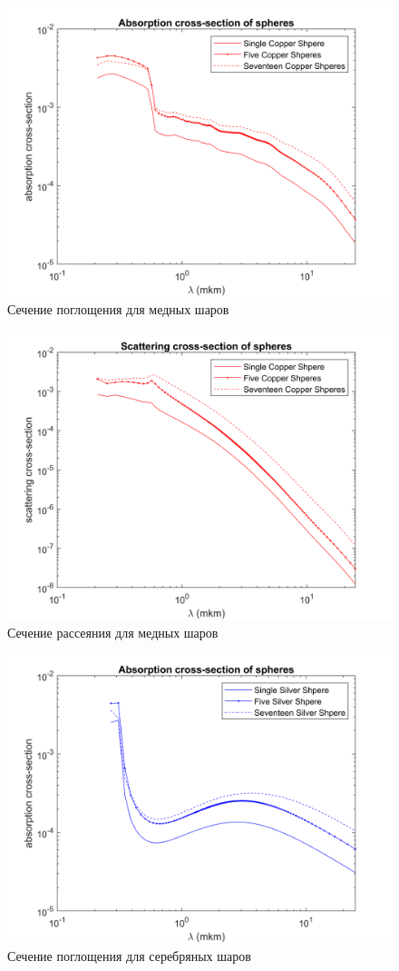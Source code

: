 \begin{figure}[h!]
	\centering
	\includegraphics[width=0.8\linewidth]{absorpForCopper}
	\caption{Сечение поглощения для медных шаров}
	\label{fig:absorpForCopper}
\end{figure}
\begin{figure}[h!]
	\centering
	\includegraphics[width=0.8\linewidth]{scatForCopper}
	\caption{Сечение рассеяния для медных шаров}
	\label{fig:scatForCopper}
\end{figure} 
\begin{figure}[h!]
	\centering
	\includegraphics[width=0.8\linewidth]{absorpForSilver}
	\caption{Сечение поглощения для серебряных шаров}
	\label{fig:absorpForSilver}
\end{figure}
